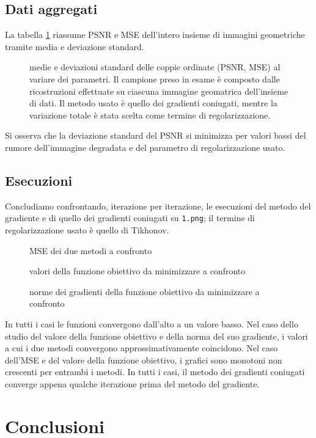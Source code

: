 \documentclass[a4paper]{article}
\begin{document}
\subsection{Dati aggregati}
La tabella \ref{fig:aggregation} riassume PSNR e MSE dell'intero insieme di
immagini geometriche tramite media e deviazione standard.
\begin{figure}\label{fig:aggregation}
    \begin{center}
        \scalebox{0.65}{}
    \end{center}
    \caption{medie e deviazioni standard delle coppie ordinate (PSNR, MSE) al
    variare dei parametri. Il campione preso in esame è composto dalle
    ricostruzioni effettuate su ciascuna immagine geomatrica dell'insieme di
    dati. Il metodo usato è quello dei gradienti coniugati, mentre la variazione totale è stata scelta come
    termine di regolarizzazione.}
\end{figure}
Si osserva che la deviazione standard del PSNR si minimizza per valori bassi
del rumore dell'immagine degradata e del parametro di regolarizzazione usato.

\subsection{Esecuzioni}
Concludiamo confrontando, iterazione per iterazione, le esecuzioni del metodo
del gradiente e di quello dei gradienti coniugati su \verb!1.png!; il termine di
regolarizzazione usato è quello di Tikhonov.
\begin{figure}
    \begin{center}
        \scalebox{0.65}{}
    \end{center}
    \caption{MSE dei due metodi a confronto}
\end{figure}
\begin{figure}
    \begin{center}
        \scalebox{0.65}{}
    \end{center}
    \caption{valori della funzione obiettivo da minimizzare a confronto}
\end{figure}
\begin{figure}
    \begin{center}
        \scalebox{0.65}{}
    \end{center}
    \caption{norme dei gradienti della funzione obiettivo da minimizzare a
    confronto}
\end{figure}
In tutti i casi le funzioni convergono dall'alto a un valore basso. Nel caso
dello studio del valore della funzione obiettivo e della norma del suo
gradiente, i valori a cui i due metodi convergono approssimativamente
coincidono. Nel caso dell'MSE e del valore della funzione obiettivo, i grafici
sono monotoni non crescenti per entrambi i metodi. In tutti i casi, il metodo
dei gradienti coniugati converge appena qualche iterazione prima del metodo del
gradiente.

\section{Conclusioni}
\end{document}
